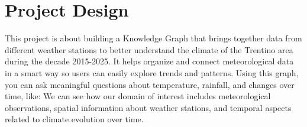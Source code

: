 
\section{Project Design}
This project is about building a Knowledge Graph that brings together data from different weather stations to better
understand the climate of the Trentino area during the decade 2015-2025. It helps organize and connect meteorological data in a
smart way so users can easily explore trends and patterns. Using this graph, you can ask meaningful questions about
temperature, rainfall, and changes over time, like:
We can see how our domain of interest includes meteorological observations, spatial information about weather stations,
and temporal aspects related to climate evolution over time.
